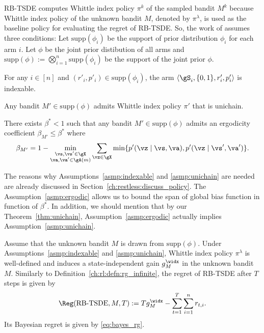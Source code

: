RB-TSDE \cite{akbarzadeh2022learning} computes Whittle index policy $\pi^k$ of the sampled bandit $M^k$ because Whittle index policy of the unknown bandit $M$, denoted by $\pi^\lambda$, is used as the baseline policy for evaluating the regret of RB-TSDE.
So, the work of \cite{akbarzadeh2022learning} assumes three conditions: Let $\mathrm{supp}(\phi_i)$ be the support of prior distribution $\phi_i$ for each arm $i$.
Let $\phi$ be the joint prior distibution of all arms and $\mathrm{supp}(\phi):=\bigotimes_{i=1}^n\mathrm{supp}(\phi_i)$ be the support of the joint prior $\phi$.
\begin{asmp}
    \label{asmp:indexable}
    For any $i\in[n]$ and $(r'_i,p'_i)\in\mathrm{supp}(\phi_i)$, the arm $\langle\gS_i,\{0,1\},r'_i,p'_i\rangle$ is indexable.
\end{asmp}
\begin{asmp}
    \label{asmp:unichain}
    Any bandit $M'\in\mathrm{supp}(\phi)$ admits Whittle index policy $\pi'$ that is unichain.
\end{asmp}
\begin{asmp}
    \label{asmp:ergodic}
    There exists $\beta^*<1$ such that any bandit $M'\in\mathrm{supp}(\phi)$ admits an ergodicity coefficient $\beta_{M'}\le \beta^*$ where
    \begin{align}
        \label{eq:ergodic_M}
        \beta_{M'} = 1-\min_{\substack{\vs,\vs'\in\gX \\\va,\va'\in\gA(m)}} \sum_{\vz\in\gX} \min\{p'(\vz \mid \vs, \va), p'(\vz \mid \vs', \va')\}.
    \end{align}
\end{asmp}
The reasons why Assumptions~\ref{asmp:indexable} and \ref{asmp:unichain} are needed are already discussed in Section~\ref{ch:restless:discuss_policy}.
The Assumption~\ref{asmp:ergodic} allows us to bound the span of global bias function in function of $\beta^*$.
In addition, we should mention that by our Theorem~\ref{thm:unichain}, Assumption~\ref{asmp:ergodic} actually implies Assumption~\ref{asmp:unichain}.

Assume that the unknown bandit $M$ is drawn from $\mathrm{supp}(\phi)$.
Under Assumptions~\ref{asmp:indexable} and \ref{asmp:unichain}, Whittle index policy $\pi^\lambda$ is well-defined and induces a state-independent gain $g^\widx_M$ in the unknown bandit $M$.
Similarly to Definition~\ref{ch:rl:defn:rg_infinite}, the regret of RB-TSDE after $T$ steps is given by
\begin{align}
    \Reg(\textnormal{RB-TSDE},M,T) := Tg^\widx_M - \sum_{t=1}^{T} \sum_{i=1}^nr_{t,i}. \label{ch:restless:eq:regret}
\end{align}
Its Bayesian regret is given by \eqref{eq:bayes_rg}.


